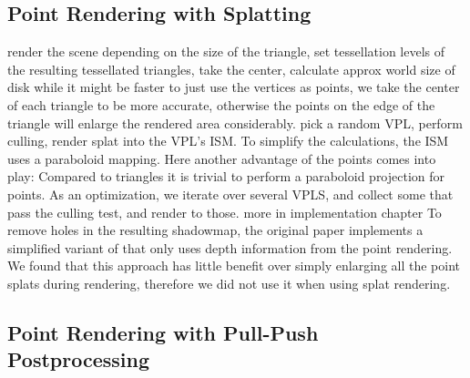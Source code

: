 \subsection{Point Rendering with Splatting}
\begin{outline}
\1 render the scene
\1 depending on the size of the triangle, set tessellation levels
\1 of the resulting tessellated triangles, take the center, calculate approx world size of disk
\1 while it might be faster to just use the vertices as points, we take the center of each triangle to be more accurate, otherwise the points on the edge of the triangle will enlarge the rendered area considerably.
\1 pick a random VPL, perform culling, render splat into the VPL's ISM. To simplify the calculations, the ISM uses a paraboloid mapping. Here another advantage of the points comes into play: Compared to triangles it is trivial to perform a paraboloid projection for points.
\1 As an optimization, we iterate over several VPLS, and collect some that pass the culling test, and render to those. more in implementation chapter
\1 To remove holes in the resulting shadowmap, the original paper implements a simplified variant of \citet{Marroquim:2007:reconstruction} that only uses depth information from the point rendering. We found that this approach has little benefit over simply enlarging all the point splats during rendering, therefore we did not use it when using splat rendering.
\end{outline}

\subsection{Point Rendering with Pull-Push Postprocessing}

